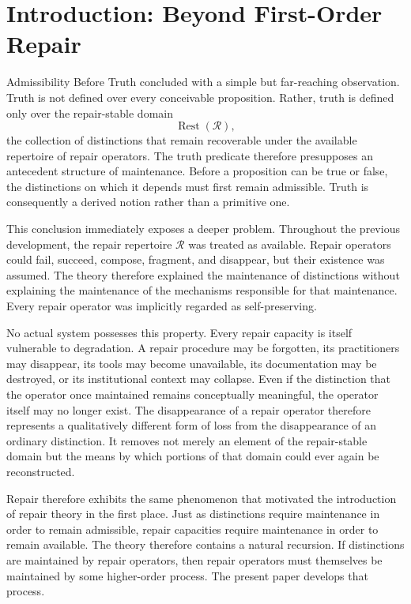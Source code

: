 \documentclass[12pt,oneside]{article}
\theoremstyle{plain}
\theoremstyle{definition}
\theoremstyle{remark}
\theoremstyle{plain}
\DeclareMathOperator{\Rest}{Rest}
\begin{document}
\section{Introduction: Beyond First-Order Repair}

Admissibility Before Truth concluded with a simple but far-reaching observation. Truth is not
defined over every conceivable proposition. Rather, truth is defined only over the repair-stable
domain
\[
\Rest(\mathcal{R}),
\]
the collection of distinctions that remain recoverable under the available repertoire of repair
operators. The truth predicate therefore presupposes an antecedent structure of maintenance. Before
a proposition can be true or false, the distinctions on which it depends must first remain
admissible. Truth is consequently a derived notion rather than a primitive one.

This conclusion immediately exposes a deeper problem. Throughout the previous development, the
repair repertoire $\mathcal{R}$ was treated as available. Repair operators could fail, succeed,
compose, fragment, and disappear, but their existence was assumed. The theory therefore explained
the maintenance of distinctions without explaining the maintenance of the mechanisms responsible
for that maintenance. Every repair operator was implicitly regarded as self-preserving.

No actual system possesses this property. Every repair capacity is itself vulnerable to degradation.
A repair procedure may be forgotten, its practitioners may disappear, its tools may become
unavailable, its documentation may be destroyed, or its institutional context may collapse. Even
if the distinction that the operator once maintained remains conceptually meaningful, the operator
itself may no longer exist. The disappearance of a repair operator therefore represents a
qualitatively different form of loss from the disappearance of an ordinary distinction. It removes
not merely an element of the repair-stable domain but the means by which portions of that domain
could ever again be reconstructed.

Repair therefore exhibits the same phenomenon that motivated the introduction of repair theory in
the first place. Just as distinctions require maintenance in order to remain admissible, repair
capacities require maintenance in order to remain available. The theory therefore contains a
natural recursion. If distinctions are maintained by repair operators, then repair operators must
themselves be maintained by some higher-order process. The present paper develops that process.
\end{document}
